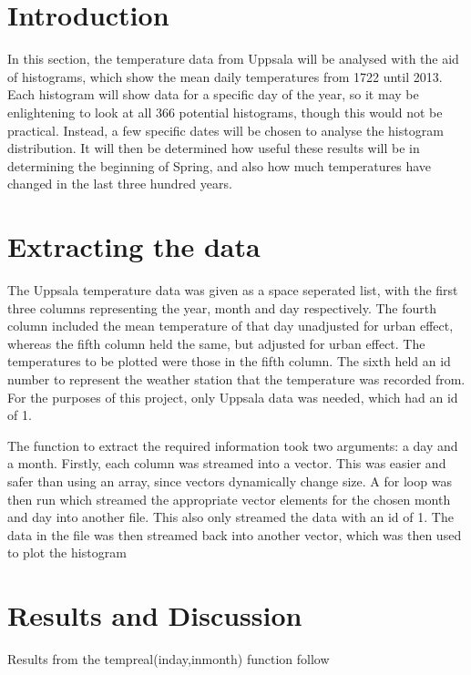 \documentclass[a4paper,10pt,oneside]{article}
\author{Cameron Robertson}
\date{11/09/17}
\begin{document}
\section{Introduction}
\label{sec:intro}

 In this section, the temperature
data from Uppsala will be analysed with the aid of histograms, which show the mean daily
temperatures from 1722 until 2013. Each histogram will show data for a specific day of the year,
so it may be enlightening to look at all 366 potential histograms, though this would
not be practical. Instead, a few specific dates will be chosen to analyse the histogram
distribution. It will then be determined how useful these results will be in determining the beginning
of Spring, and also how much temperatures have changed in the last three hundred years.

\section{Extracting the data}
\label{sec:data}

The Uppsala temperature data was given as a space seperated list, with the first three
columns representing the year, month and day respectively. The fourth column included the mean
temperature of that day unadjusted for urban effect, whereas the fifth column held
the same, but adjusted for urban effect. The temperatures to be plotted were those 
in the fifth column. The sixth held an id number to represent the weather station
that the temperature was recorded from. For the purposes of this project, only Uppsala
data was needed, which had an id of 1.

The function to extract the required information took two arguments: a day and a month. Firstly, each column was streamed into a vector. This was
easier and safer than using an array, since vectors dynamically change size. A for loop was then run which streamed the appropriate vector elements for the
chosen month and day into another file. This also only streamed the data with an id of 1. The data in the file was then streamed back into another
vector, which was then used to plot the histogram

\section{Results and Discussion}
\label{sec:res}

Results from the tempreal(inday,inmonth) function follow
\end{document}

